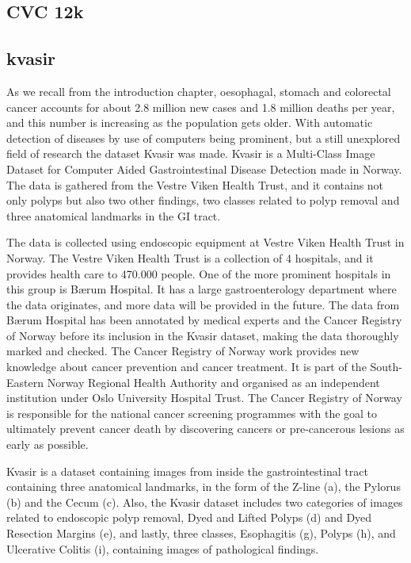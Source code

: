  


\subsection{CVC 12k}






\iffalse

\subsection{kvasir}


As we recall from the introduction chapter, oesophagal, stomach and colorectal cancer accounts for about 2.8 million new cases and 1.8 million deaths per year, and this number is increasing as the population gets older.   With automatic detection of diseases by use of computers being prominent, but a still unexplored field of research the dataset Kvasir was made.
Kvasir is a Multi-Class Image Dataset for Computer Aided Gastrointestinal Disease Detection made in Norway. The data is gathered from the Vestre Viken Health Trust, and it contains not only polyps but also two other findings, two classes related to polyp removal and three anatomical landmarks in the GI tract.

The data is collected using endoscopic equipment at Vestre Viken Health Trust in Norway. The Vestre Viken Health Trust is a collection of 4 hospitals, and it provides health care to 470.000 people.
One of the more prominent hospitals in this group is Bærum Hospital. It has a large gastroenterology department where the data originates, and more data will be provided in the future. The data from Bærum Hospital has been annotated by medical experts and the Cancer Registry of Norway before its inclusion in the Kvasir dataset, making the data thoroughly marked and checked.
The Cancer Registry of Norway work provides new knowledge about cancer prevention and cancer treatment. It is part of the South-Eastern Norway Regional Health Authority and organised as an independent institution under Oslo University Hospital Trust. The Cancer Registry of Norway is responsible for the national cancer screening programmes with the goal to ultimately prevent cancer death by discovering cancers or pre-cancerous lesions as early as possible. 

\cite{runeMedico2018}

Kvasir is a dataset containing images from inside the gastrointestinal tract containing three anatomical landmarks, in the form of the Z-line (a), the Pylorus (b) and the Cecum (c). Also, the Kvasir dataset includes two categories of images related to endoscopic polyp removal, Dyed and Lifted Polyps (d) and Dyed Resection Margins (e), and lastly, three classes, Esophagitis (g), Polyps (h), and Ulcerative Colitis (i), containing images of pathological findings.


